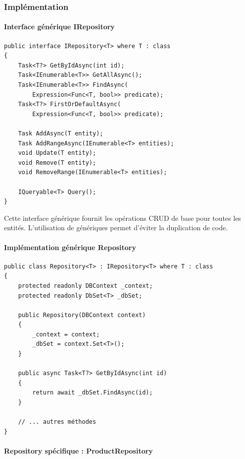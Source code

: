 \documentclass[12pt,a4paper]{article}
\begin{document}
\subsubsection{Implémentation}

\paragraph{Interface générique IRepository}

\begin{lstlisting}[caption=Interface générique du Repository, float=h!]
public interface IRepository<T> where T : class
{
    Task<T?> GetByIdAsync(int id);
    Task<IEnumerable<T>> GetAllAsync();
    Task<IEnumerable<T>> FindAsync(
        Expression<Func<T, bool>> predicate);
    Task<T?> FirstOrDefaultAsync(
        Expression<Func<T, bool>> predicate);
    
    Task AddAsync(T entity);
    Task AddRangeAsync(IEnumerable<T> entities);
    void Update(T entity);
    void Remove(T entity);
    void RemoveRange(IEnumerable<T> entities);
    
    IQueryable<T> Query();
}
\end{lstlisting}

Cette interface générique fournit les opérations CRUD de base pour toutes les entités. L'utilisation de génériques permet d'éviter la duplication de code.

\paragraph{Implémentation générique Repository}

\begin{lstlisting}[caption=Implémentation générique, float=h!]
public class Repository<T> : IRepository<T> where T : class
{
    protected readonly DBContext _context;
    protected readonly DbSet<T> _dbSet;

    public Repository(DBContext context)
    {
        _context = context;
        _dbSet = context.Set<T>();
    }

    public async Task<T?> GetByIdAsync(int id)
    {
        return await _dbSet.FindAsync(id);
    }
    
    // ... autres méthodes
}
\end{lstlisting}

\paragraph{Repository spécifique : ProductRepository}
\end{document}
